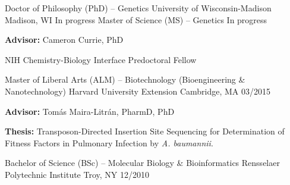 

\begin{cventries}

\cventry
	{Doctor of Philosophy (PhD) -- Genetics}
	{University of Wisconsin-Madison}
	{Madison, WI}
	{In progress}
	{}
	\vspace{-0.4cm}
\cventry
	{Master of Science (MS) -- Genetics}
	{}
	{}
	{In progress}
	{
      \begin{cvitems}
      	\item {\textbf{Advisor:} Cameron Currie, PhD}
      	\item {NIH Chemistry-Biology Interface Predoctoral Fellow}
      \end{cvitems}
    }

\cventry
	{Master of Liberal Arts (ALM) -- Biotechnology (Bioengineering \& Nanotechnology)}
	{Harvard University Extension}
	{Cambridge, MA}
	{03/2015}
	{
      \begin{cvitems}
      	\item {\textbf{Advisor:} Tom\'{a}s Maira-Litr\'{a}n, PharmD, PhD}
      	\item {\textbf{Thesis:} Transposon-Directed Insertion Site Sequencing for Determination of Fitness Factors in Pulmonary Infection by \textit{A. baumannii}.}
      \end{cvitems}
    }
    
\cventry
	{Bachelor of Science (BSc) -- Molecular Biology \& Bioinformatics}
	{Rensselaer Polytechnic Institute}
	{Troy, NY}
	{12/2010}
	{}
    
\end{cventries}
